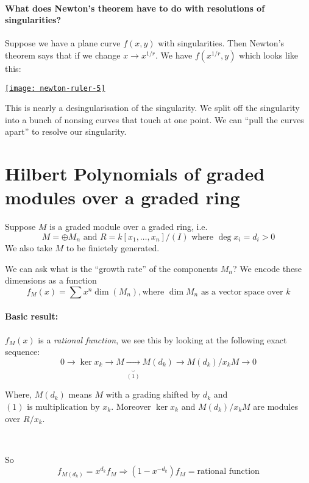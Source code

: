 \paragraph*{What does Newton's theorem have to do with resolutions of singularities?}

Suppose we have a plane curve $f(x,y)$ with singularities. Then Newton's theorem says that if we change $x\rightarrow x^{1/r}$. We have $f(x^{1/r}, y)$ which looks like this:

\begin{center}
    \href{https://youtu.be/paenRVq0vnc?t=1351}{\texttt{[image: newton-ruler-5]}}   
\end{center}

This is nearly a desingularisation of the singularity. We split off the singularity into a bunch of nonsing curves that touch at one point. We can ``pull the curves apart'' to resolve our singularity.


\section{Hilbert Polynomials of graded modules over a graded ring}

Suppose $M$ is a graded module over a graded ring, i.e.\[
    M = \oplus M_n \text{ and }R = k[x_1,\ldots,x_n]/(I) \text{ where }\deg x_i = d_i>0
\]
We also take $M$ to be finietely generated.

We can ask what is the ``growth rate'' of the components $M_n$? We encode these dimensions as a function\[
    f_M(x) = \sum x^n \dim(M_n), \text{where }\dim M_n\text{ as a vector space over }k    
\]

\paragraph*{Basic result:}

$f_M(x)$ is a \textit{rational function}, we see this by looking at the following exact sequence:\[
    0\rightarrow \ker x_k\rightarrow M\underbrace{\rightarrow}_{(1)} M(d_k)\rightarrow M(d_k)/x_k M\rightarrow 0    
\]

Where, $M(d_k)$ means $M$ with a grading shifted by $d_k$ and $(1) \text{ is multiplication by }x_k$. Moreover $\ker x_k$ and $M(d_k)/x_k M$ are modules over $R/x_k$.

\

So \[f_{M(d_k)} = x^{d_k}f_M \Rightarrow (1-x^{-d_k})f_M = \text{rational function}\]

